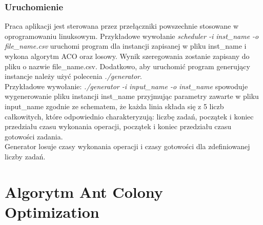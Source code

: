 \documentclass[10pt,a4paper]{article}
\begin{document}
\subsubsection{Uruchomienie}
Praca aplikacji jest sterowana przez przełączniki powszechnie stosowane w
oprogramowaniu linuksowym.  Przykładowe wywołanie \textit{scheduler -i
inst\_name -o file\_name.csv} uruchomi program dla instancji zapisanej w pliku
inst\_name i wykona algorytm ACO oraz losowy. Wynik szeregowania zostanie
zapisany do pliku o nazwie file\_name.csv.  Dodatkowo, aby uruchomić program
generujący instancje należy użyć polecenia \textit{./generator}.\\ Przykładowe wywołanie:
\textit{./generator -i input\_name -o inst\_name } spowoduje wygenerowanie pliku
instancji inst\_name przyjmując parametry zawarte w pliku input\_name zgodnie ze
schematem, że każda linia składa się z 5 liczb całkowitych, które odpowiednio
charakteryzują: liczbę zadań, początek i koniec przedziału czasu wykonania
operacji, początek i koniec przedziału czasu gotowości zadania.\\ Generator
losuje czasy wykonania operacji i czasy gotowości dla zdefiniowanej liczby
zadań.

\section{Algorytm Ant Colony Optimization}
\end{document}
